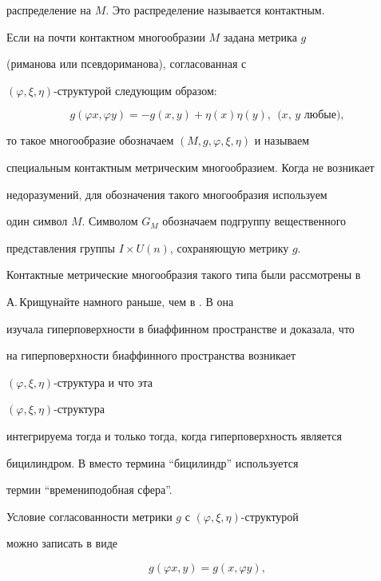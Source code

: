 распределение на $M$. Это распределение называется контактным.





Если на почти контактном многообразии $M$ задана метрика $g$


(риманова или псевдориманова), согласованная с


$(\varphi,\xi,\eta)$-структурой следующим образом:


$$


g(\varphi x,\varphi y)=-g(x,y)+\eta(x)\eta(y),


\ \ \text{($x$, $y$ любые)},


$$


то такое многообразие обозначаем $(M,g,\varphi,\xi,\eta)$ и называем


специальным контактным метрическим многообразием. Когда не возникает


недоразумений, для обозначения такого многообразия используем


один символ $M$. Символом $G_M$ обозначаем подгруппу вещественного


представления группы $I\times U(n)$, сохраняющую метрику $g$.





Контактные метрические многообразия такого типа были рассмотрены в 


\cite{2} А.\,Крищунайте намного раньше, чем в \cite{1}. В \cite{2} она 


изучала гиперповерхности в биаффинном пространстве и доказала, что 


на гиперповерхности биаффинного пространства возникает


$(\varphi,\xi,\eta)$-структура и что эта


$(\varphi,\xi,\eta)$-структура 


интегрируема тогда и только тогда, когда гиперповерхность является 


бицилиндром. В \cite{1} вместо термина ``бицилиндр'' используется 


термин ``времениподобная сфера''. 





Условие согласованности метрики $g$ с $(\varphi,\xi,\eta)$-структурой


можно записать в виде 


\begin{equation} 


g(\varphi x,y)=g(x,\varphi y),


\end{equation} 


